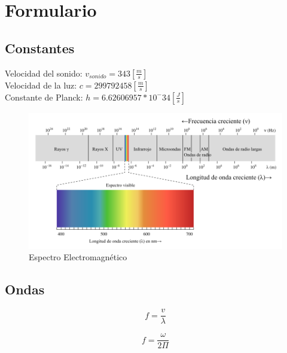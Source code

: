 \documentclass[]{article}
\begin{document}
\section{Formulario}

\subsection{Constantes}

Velocidad del sonido: $v_{sonido} = 343 [\frac{m}{s}]$\\
Velocidad de la luz: $c = 299 792 458[\frac{m}{s}]$\\
Constante de Planck: $h = 6.62606957*10^-34 [\frac{J}{s}]$\\


\begin{figure}[H]
		\centering	
	\includegraphics[scale=0.6]{Imagenes/EspectroLuz}
	\caption{Espectro Electromagnético}
	\label{fig:EL}
\end{figure}

\subsection{Ondas}

\begin{equation}
f=\frac{v}{\lambda}
\end{equation}

\begin{equation}
f=\frac{\omega}{2 \Pi}
\end{equation}
\end{document}
